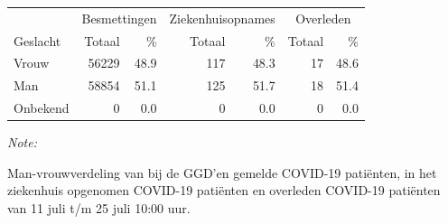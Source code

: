 \documentclass[
  english,
  man,floatsintext]{apa6}
\begin{document}
\begin{table}
\centering\begingroup\fontsize{11}{13}\selectfont

\begin{threeparttable}
\begin{tabular}{lrrrrrr}
\toprule
\multicolumn{1}{c}{ } & \multicolumn{2}{c}{Besmettingen} & \multicolumn{2}{c}{Ziekenhuisopnames} & \multicolumn{2}{c}{Overleden} \\
\cmidrule(l{3pt}r{3pt}){2-3} \cmidrule(l{3pt}r{3pt}){4-5} \cmidrule(l{3pt}r{3pt}){6-7}
Geslacht & Totaal & \% & Totaal & \% & Totaal & \%\\
\midrule
Vrouw & 56229 & 48.9 & 117 & 48.3 & 17 & 48.6\\
Man & 58854 & 51.1 & 125 & 51.7 & 18 & 51.4\\
Onbekend & 0 & 0.0 & 0 & 0.0 & 0 & 0.0\\
\bottomrule
\end{tabular}
\begin{tablenotes}
\item \textit{Note: } 
\item Man-vrouwverdeling van bij de GGD’en gemelde COVID-19 patiënten, in het ziekenhuis opgenomen COVID-19 patiënten en overleden COVID-19 patiënten van 11 juli t/m 25 juli 10:00 uur.
\end{tablenotes}
\end{threeparttable}
\endgroup{}
\end{table}
\newpage
\end{document}
